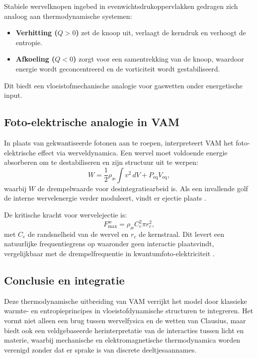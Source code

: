 Stabiele wervelknopen ingebed in evenwichtsdrukoppervlakken gedragen zich analoog aan thermodynamische systemen:
\begin{itemize}
\item \textbf{Verhitting ($Q > 0$)} zet de knoop uit, verlaagt de kerndruk en verhoogt de entropie. \item \textbf{Afkoeling ($Q < 0$)} zorgt voor een samentrekking van de knoop, waardoor energie wordt geconcentreerd en de vorticiteit wordt gestabiliseerd.
\end{itemize}
Dit biedt een vloeistofmechanische analogie voor gaswetten onder energetische input.

\subsection{Foto-elektrische analogie in VAM}

In plaats van gekwantiseerde fotonen aan te roepen, interpreteert VAM het foto-elektrische effect via werveldynamica. Een wervel moet voldoende energie absorberen om te destabiliseren en zijn structuur uit te werpen:
\begin{equation}
W = \frac{1}{2} \rho_\text{\ae} \int v^2 \, dV + P_\text{eq} V_\text{eq},\label{eq:foto-elektrische_arbeid}
\end{equation}
waarbij $W$ de drempelwaarde voor desintegratiearbeid is. Als een invallende golf de interne wervelenergie verder moduleert, vindt er ejectie plaats \cite{vam2025unified}.

De kritische kracht voor wervelejectie is:
\begin{equation}
F^{\text{\ae}}_{\text{max}} = \rho_\text{\ae} C_e^2 \pi r_c^2,\label{eq:critical_force}
\end{equation}
met $C_e$ de randsnelheid van de wervel en $r_c$ de kernstraal. Dit levert een natuurlijke frequentiegrens op waaronder geen interactie plaatsvindt, vergelijkbaar met de drempelfrequentie in kwantumfoto-elektriciteit \cite{einstein1905photoelectric}.

\subsection*{Conclusie en integratie}

Deze thermodynamische uitbreiding van VAM verrijkt het model door klassieke warmte- en entropieprincipes in vloeistofdynamische structuren te integreren. Het vormt niet alleen een brug tussen wervelfysica en de wetten van Clausius, maar biedt ook een veldgebaseerde herinterpretatie van de interacties tussen licht en materie, waarbij mechanische en elektromagnetische thermodynamica worden verenigd zonder dat er sprake is van discrete deeltjesaannames.